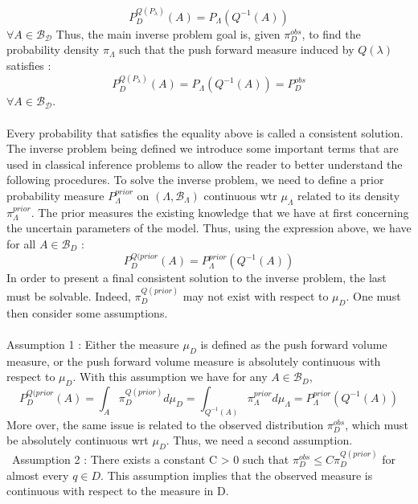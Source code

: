 \documentclass[11pt, a4paper, English]{report}
\begin{document}
$$ P_D^{Q(P_\lambda)}(A) = P_\Lambda (Q^{-1}(A))$$
$\forall A \in \mathcal{B_D}$
Thus, the main inverse problem goal is, given $\pi_D^{obs}$, to find the probability density $\pi_\Lambda$ such that the push forward measure induced by $Q(\lambda)$ satisfies :
$$ P_D^{Q(P_\lambda)}(A) = P_\Lambda (Q^{-1}(A)) = P_D^{obs}$$
$\forall A \in \mathcal{B_D}$. \\\\
Every probability that satisfies the equality above is called a consistent solution.
The inverse problem being defined we introduce some important terms that are used in classical inference problems to allow the reader to better understand the following procedures. To solve the inverse problem, we need to define a prior probability measure $P_\Lambda^{prior}$ on $(\Lambda, \mathcal{B}_\Lambda)$ continuous wtr $\mu_\Lambda$ related to its density $\pi_\Lambda^{prior}$. The prior measures the existing knowledge that we have at first concerning the uncertain parameters of the model. Thus, using the expression above, we have for all $A \in \mathcal{B}_D$ :
$$ P_D^{Q(prior}(A) = P_\Lambda^{prior} (Q^{-1}(A))$$
In order to present a final consistent solution to the inverse problem, the last must be solvable. Indeed, $\pi_D^{Q(prior)}$ may not exist with respect to $\mu_D$. One must then consider some assumptions.
\\\\
Assumption 1 : Either the measure $\mu_D$ is defined as the push forward volume measure, or the push forward volume measure is absolutely continuous with respect to $\mu_D$. With this assumption we have for any $A \in \mathcal{B}_D$,
$$ P_D^{Q(prior}(A) = \int_A \pi_D^{Q(prior)} d\mu_D = \int_{Q^{-1}(A)} \pi_\Lambda ^{prior} d\mu_\Lambda = P_\Lambda^{prior} (Q^{-1}(A))$$
More over, the same issue is related to the observed distribution $\pi_D^{obs}$, which must be absolutely continuous wrt $\mu_D$. Thus, we need a second assumption.\\\
Assumption 2 : There exists a constant C > 0 such that $\pi_D^{obs} \le C \pi_D^{Q(prior)}$
for almost every $q\in D$. This assumption implies that the observed measure is continuous with respect to the measure in D.
\newpage
\end{document}
